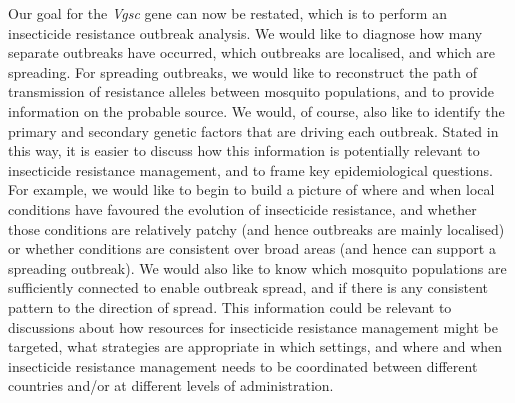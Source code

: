 \documentclass[a4paper,11pt,abstracton]{scrartcl}
\begin{document}
%
Our goal for the \textit{Vgsc} gene can now be restated, which is to perform an insecticide resistance outbreak analysis.
%
We would like to diagnose how many separate outbreaks have occurred, which outbreaks are localised, and which are spreading.
%
For spreading outbreaks, we would like to reconstruct the path of transmission of resistance alleles between mosquito populations, and to provide information on the probable source. 
%
We would, of course, also like to identify the primary and secondary genetic factors that are driving each outbreak.
%
Stated in this way, it is easier to discuss how this information is potentially relevant to insecticide resistance management, and to frame key epidemiological questions.
%
For example, we would like to begin to build a picture of where and when local conditions have favoured the evolution of insecticide resistance, and whether those conditions are relatively patchy (and hence outbreaks are mainly localised) or whether conditions are consistent over broad areas (and hence can support a spreading outbreak).
%
We would also like to know which mosquito populations are sufficiently connected to enable outbreak spread, and if there is any consistent pattern to the direction of spread.
%
This information could be relevant to discussions about how resources for insecticide resistance management might be targeted, what strategies are appropriate in which settings, and where and when insecticide resistance management needs to be coordinated between different countries and/or at different levels of administration.
%
\end{document}
